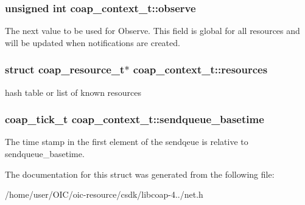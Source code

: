 \subsubsection[{observe}]{\setlength{\rightskip}{0pt plus 5cm}unsigned int coap\+\_\+context\+\_\+t\+::observe}\label{structcoap__context__t_a0c362c57200374b1e7d2331ec3994485}
The next value to be used for Observe. This field is global for all resources and will be updated when notifications are created. \hypertarget{structcoap__context__t_aaf441070f9b1f2aea225fc61b60a6bb8}{}
\subsubsection[{resources}]{\setlength{\rightskip}{0pt plus 5cm}struct {\bf coap\+\_\+resource\+\_\+t}$\ast$ coap\+\_\+context\+\_\+t\+::resources}\label{structcoap__context__t_aaf441070f9b1f2aea225fc61b60a6bb8}
hash table or list of known resources \hypertarget{structcoap__context__t_a080dc026c9eec48849d0140b433e04bb}{}
\subsubsection[{sendqueue\+\_\+basetime}]{\setlength{\rightskip}{0pt plus 5cm}coap\+\_\+tick\+\_\+t coap\+\_\+context\+\_\+t\+::sendqueue\+\_\+basetime}\label{structcoap__context__t_a080dc026c9eec48849d0140b433e04bb}
The time stamp in the first element of the sendqeue is relative to sendqueue\+\_\+basetime. 

The documentation for this struct was generated from the following file\+:\begin{DoxyCompactItemize}
\item 
/home/user/\+O\+I\+C/oic-\/resource/csdk/libcoap-\/4../net.\+h\end{DoxyCompactItemize}
